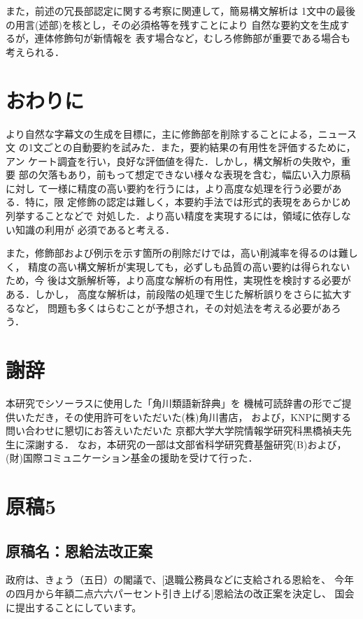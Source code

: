 また，前述の冗長部認定に関する考察に関連して，簡易構文解析は
1文中の最後の用言(述部)を核とし，その必須格等を残すことにより
自然な要約文を生成するが，連体修飾句が新情報を
表す場合など，むしろ修飾部が重要である場合も考えられる．

\section{おわりに}

より自然な字幕文の生成を目標に，主に修飾部を削除することによる，ニュース文
の1文ごとの自動要約を試みた．また，要約結果の有用性を評価するために，アン
ケート調査を行い，良好な評価値を得た．しかし，構文解析の失敗や，重要
部の欠落もあり，前もって想定できない様々な表現を含む，幅広い入力原稿に対し
て一様に精度の高い要約を行うには，より高度な処理を行う必要がある．特に，限
定修飾の認定は難しく，本要約手法では形式的表現をあらかじめ列挙することなどで
対処した．より高い精度を実現するには，領域に依存しない知識の利用が
必須であると考える．
\label{part:005}

また，修飾部および例示を示す箇所の削除だけでは，高い削減率を得るのは難しく，
精度の高い構文解析が実現しても，必ずしも品質の高い要約は得られないため，今
後は文脈解析等，より高度な解析の有用性，実現性を検討する必要がある．しかし，
高度な解析は，前段階の処理で生じた解析誤りをさらに拡大するなど，
問題も多くはらむことが予想され，その対処法を考える必要があろう．

\section{謝辞}
本研究でシソーラスに使用した「角川類語新辞典」\cite{kadokawa}を
機械可読辞書の形でご提供いただき，その使用許可をいただいた(株)角川書店，
および，KNPに関する問い合わせに懇切にお答えいただいた
京都大学大学院情報学研究科黒橋禎夫先生に深謝する．
なお，本研究の一部は文部省科学研究費基盤研究(B)および，
(財)国際コミュニケーション基金の援助を受けて行った．


\appendix

\section{原稿5}
\label{section:ap_g_5}

\subsection*{原稿名：恩給法改正案}

政府は、きょう（五日）の閣議で、[退職公務員などに支給される恩給を、
今年の四月から年額二点六六パーセント引き上げる]恩給法の改正案を決定し、
国会に提出することにしています。

